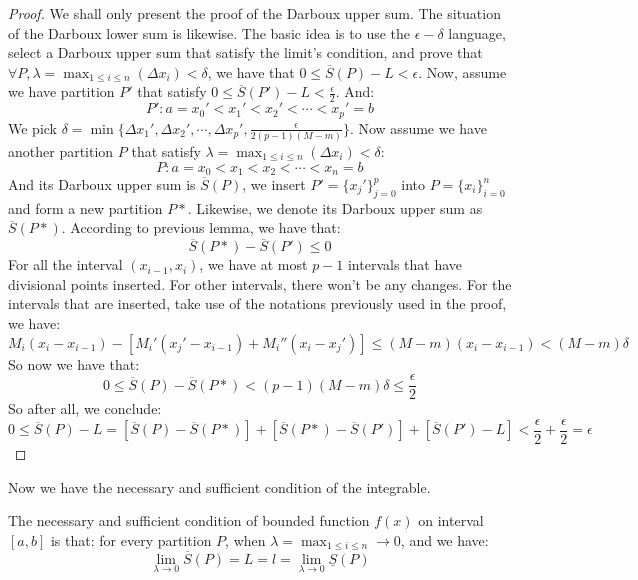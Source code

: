\begin{proof}
We shall only present the proof of the Darboux upper sum. The situation of the Darboux lower sum is likewise.
The basic idea is to use the $\epsilon - \delta$ language, select a Darboux upper sum that satisfy the limit's condition, and prove that $\forall P, \lambda = \max_{1 \leq i \leq n} (\Delta x_i) < \delta$, we have that $0 \leq \overline{S}(P)-L < \epsilon$.
Now, assume we have partition $P'$ that satisfy $0 \leq \overline{S}(P') - L < \frac{\epsilon}{2}$. And:
\[P' : a = x_0' <x_1' < x_2' < \cdots < x_p' = b\]
We pick $\delta = \min \{\Delta x_1', \Delta x_2', \cdots , \Delta x_p', \frac{\epsilon}{2(p-1)(M-m)}\}$.
Now assume we have another partition $P$ that satisfy $\lambda = \max_{1 \leq i \leq n} (\Delta x_i) < \delta$:
\[
P: a = x_0 < x_1 < x_2 < \cdots <x_n = b
\]
And its Darboux upper sum is $\overline{S}(P)$, we insert $P' = \{x_j'\}^p_{j=0}$ into $P = \{x_i\}^n_{i=0}$ and form a new partition $P*$. Likewise, we denote its Darboux upper sum as $\overline{S}(P*)$.
According to previous lemma, we have that:
\[\overline{S}(P*)-\overline{S}(P') \leq 0\]
For all the interval $(x_{i-1},x_i)$, we have at most $p-1$ intervals that have divisional points inserted. For other intervals, there won't be any changes.
For the intervals that are inserted, take use of the notations previously used in the proof, we have:
\[
M_i(x_i-x_{i-1})-[M_i'(x_j'-x_{i-1})+M_i''(x_i-x_j')] \leq (M-m) (x_i-x_{i-1}) < (M-m) \delta
\]
So now we have that:
\[
0 \leq \overline{S}(P)-\overline{S}(P*)<(p-1)(M-m)\delta \leq \frac{\epsilon}{2}
\]
So after all, we conclude:
\[
0 \leq \overline{S}(P)-L = [\overline{S}(P)-\overline{S}(P*)]+[\overline{S}(P*)-\overline{S}(P')]+[\overline{S}(P')-L]<\frac{\epsilon}{2}+\frac{\epsilon}{2}=\epsilon
\]
\end{proof}

Now we have the necessary and sufficient condition of the integrable.

\begin{theorem}
The necessary and sufficient condition of bounded function $f(x)$ on interval $[a,b]$ is that: for every partition $P$, when $\lambda = \max_{1 \leq i \leq n} \to 0$, and we have:
\[
\lim_{\lambda \to 0} \overline{S}(P) = L = l = \lim_{\lambda \to 0} \underline{S}(P)
\]
\end{theorem}

